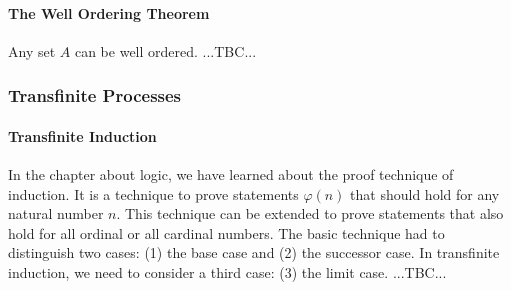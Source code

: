 







\paragraph{The Well Ordering Theorem} 
Any set $A$ can be well ordered. ...TBC...

\subsubsection{Transfinite Processes}

\paragraph{Transfinite Induction}
In the chapter about logic, we have learned about the proof technique of induction. It is a technique to prove statements $\varphi(n)$ that should hold for any natural number $n$. This technique can be extended to prove statements that also hold for all ordinal or all cardinal numbers. The basic technique had to distinguish two cases: (1) the base case and (2) the successor case. In transfinite induction, we need to consider a third case: (3) the limit case. ...TBC...



